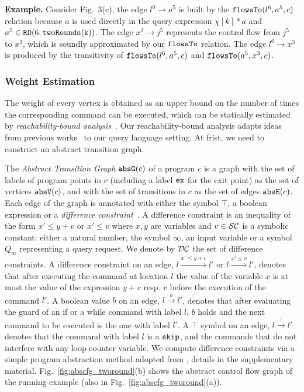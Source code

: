 \textbf{Example.}
Consider Fig.~3(c),  
the edge $l^6 \to a^5$ is built by the $\mathtt{flowsTo}(l^6, a^5, c)$ relation because
$a$ is used directly in the query expression $\chi[k]*a$
and $a^5 \in \mathtt{RD}(6, \mathtt{twoRounds(k)})$.
The edge $x^3 \to j^5$  represents the control flow from $j^5$ to $x^3$, which is soundly approximated by our $\mathtt{flowsTo}$ relation.
The edge $l^6 \to x^3$ is produced by the transitivity of $\mathtt{flowsTo}(l^6, a^5, c)$ and $\mathtt{flowsTo}(a^5, x^3, c)$. 

\subsubsection{Weight Estimation}
\label{sec:alg_weightgen}

The weight of every vertex is obtained as an upper bound on 
the number of times the corresponding command can be executed,
which can be statically estimated by \emph{reachability-bound analysis}~\cite{GulwaniZ10}.
Our reachability-bound analysis adapts ideas from previous works~\cite{ZulegerGSV11,SinnZV14,sinn2017complexity} 
to our query language setting. At frist, we need to 
construct an abstract transition graph.

The \emph{Abstract Transition Graph} $\mathtt{abs}{\mathtt{G}}(c)$ of a program $c$ is a
graph with the set of labels of program points in $c$  (including a 
label $\mathtt{ex}$ for the exit point) as the set of
vertices $\mathtt{abs}{\mathtt{V}}(c)$, and with the set of transitions in $c$ as the set of
edges $\mathtt{abs}{\mathtt{E}}(c)$. Each edge of the graph is annotated with either
the symbol $\top$, a boolean expression or a \emph{difference
constraint}~\cite{sinn2017complexity}.
A difference constraint is an inequality of the form $x' \leq y + v$ {or $x' \leq v$}
where $x, y$ are variables and $v \in \mathcal{SC}$ is a symbolic
constant: either a natural number, the symbol $\infty$, an input
variable or a symbol $Q_m$ representing a query request.  We denote by
$\mathcal{DC}$ the set of difference constraints.
A difference constraint on an edge, $l \xrightarrow{x' \leq y + v}
l'$ {or $l \xrightarrow{x' \leq v} l'$}, denotes that after executing the command at location $l$ the
value of the variable $x$ is at most the value of the expression $y +
v$ {resp. $v$} before the execution of the command $l'$.
A boolean value $b$ on an
edge, $l \xrightarrow{b} l'$, denotes that after evaluating the guard
of an if or a while command with label $l$, $b$ holds and the next
command to be executed is the one with label $l'$.  A $\top$ symbol on
an edge, $l \xrightarrow{\top} l'$ denotes that the command with label
$l$ is a $\mathtt{skip}$, {and the commands that do not interfere with any loop counter variable}.
We compute difference constraints via a
simple program abstraction method adopted
from \cite{sinn2017complexity}, details in the
supplementary material. Fig.~\ref{fig:abscfg_tworound}(b) shows the abstract control flow graph of the running example (also in Fig.~\ref{fig:abscfg_tworound}(a)).

